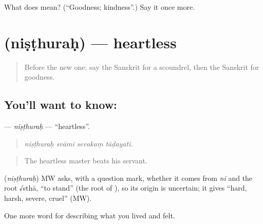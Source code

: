 \begin{tcolorbox}[breakable,colback=teal!4,colframe=teal!35!black,title={Before you move on}]
What does  mean? (\textquotedblleft{}Goodness; kindness\textquotedblright{}.) Say it once more.
\end{tcolorbox}
\section[\texorpdfstring{\sk{निष्ठुरः} (niṣṭhuraḥ)}{निष्ठुरः (niṣṭhuraḥ)}]{ (niṣṭhuraḥ) — heartless}

\label{lesson:SA-C461-nisthurah}



\begin{quote}
Before the new one: say the Sanskrit for a scoundrel, then the Sanskrit for goodness.
\end{quote}

\subsection*{You'll want to know: }
\textbf{} — \emph{niṣṭhuraḥ} — \textquotedblleft{}heartless\textquotedblright{}.

\begin{quote}
   
\end{quote}

\begin{quote}
\emph{niṣṭhuraḥ svāmī sevakaṃ tāḍayati.}
\end{quote}

\begin{quote}
The heartless master beats his servant.
\end{quote}

\begin{cousinweb}
\textbf{} (\emph{niṣṭhuraḥ}) MW asks, with a question mark, whether it comes from \emph{ni} and the root √sthā, \textquotedblleft{}to stand\textquotedblright{} (the root of \textbf{}), so its origin is uncertain; it gives \textquotedblleft{}hard, harsh, severe, cruel\textquotedblright{} (MW).
\end{cousinweb}

\begin{grammarlens}[title={What you've built}]
One more word for describing what you lived and felt.
\end{grammarlens}

